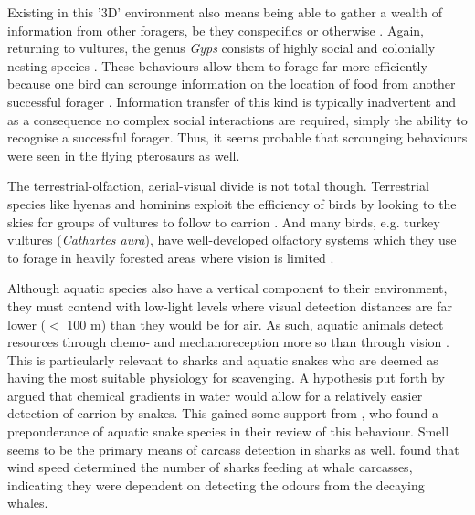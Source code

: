 \documentclass[a4paper,12pt]{article}
\begin{document}
Existing in this '3D' environment also means being able to gather a wealth of information from other foragers, be they conspecifics or otherwise \citep{jackson2008effect}.
Again, returning to vultures, the genus \textit{Gyps} consists of highly social and colonially nesting species \citep{fernandez2015density}.
These behaviours allow them to forage far more efficiently because one bird can scrounge information on the location of food from another successful forager \citep{KaneVul}.
Information transfer of this kind is typically inadvertent and as a consequence no complex social interactions are required, simply the ability to recognise a successful forager.
Thus, it seems probable that scrounging behaviours were seen in the flying pterosaurs as well. 

The terrestrial-olfaction, aerial-visual divide is not total though.
Terrestrial species like hyenas and hominins exploit the efficiency of birds by looking to the skies for groups of vultures to follow to carrion \citep{jones2015african,ruxton2013endurance}. 
And many birds, e.g. turkey vultures (\textit{Cathartes aura}), have well-developed olfactory systems \citep{AR:AR22815} which they use to forage in heavily forested areas where vision is limited \citep{houston1986olfaction}. 

Although aquatic species also have a vertical component to their environment, they must contend with low-light levels where visual detection distances are far lower ($<$ 100 m) than they would be for air.
As such, aquatic animals detect resources through chemo- and mechanoreception more so than through vision \citep{ruxton2004energetic}.
This is particularly relevant to sharks and aquatic snakes who are deemed as having the most suitable physiology for scavenging.
A hypothesis put forth by \cite{sazima1990necrofagia} argued that chemical gradients in water would allow for a relatively easier detection of carrion by snakes.
This gained some support from \cite{devault2002scavenging}, who found a preponderance of aquatic snake species in their review of this behaviour.
Smell seems to be the primary means of carcass detection in sharks as well. 
\cite{fallows2013white} found that wind speed determined the number of sharks feeding at whale carcasses, indicating they were dependent on detecting the odours from the decaying whales. 
\end{document}
